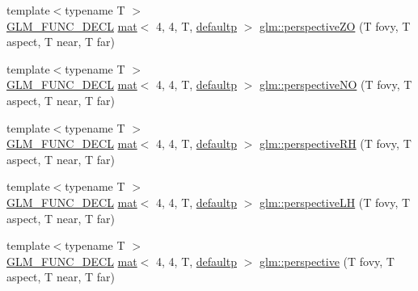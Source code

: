 \begin{DoxyCompactItemize}
\item 
{\footnotesize template$<$typename T $>$ }\\\mbox{\hyperlink{setup_8hpp_ab2d052de21a70539923e9bcbf6e83a51}{G\+L\+M\+\_\+\+F\+U\+N\+C\+\_\+\+D\+E\+CL}} \mbox{\hyperlink{structglm_1_1mat}{mat}}$<$ 4, 4, T, \mbox{\hyperlink{namespaceglm_a36ed105b07c7746804d7fdc7cc90ff25a9d21ccd8b5a009ec7eb7677befc3bf51}{defaultp}} $>$ \mbox{\hyperlink{group__gtc__matrix__transform_gaa9dfba5c2322da54f72b1eb7c7c11b47}{glm\+::perspective\+ZO}} (T fovy, T aspect, T near, T far)
\item 
{\footnotesize template$<$typename T $>$ }\\\mbox{\hyperlink{setup_8hpp_ab2d052de21a70539923e9bcbf6e83a51}{G\+L\+M\+\_\+\+F\+U\+N\+C\+\_\+\+D\+E\+CL}} \mbox{\hyperlink{structglm_1_1mat}{mat}}$<$ 4, 4, T, \mbox{\hyperlink{namespaceglm_a36ed105b07c7746804d7fdc7cc90ff25a9d21ccd8b5a009ec7eb7677befc3bf51}{defaultp}} $>$ \mbox{\hyperlink{group__gtc__matrix__transform_gaf497e6bca61e7c87088370b126a93758}{glm\+::perspective\+NO}} (T fovy, T aspect, T near, T far)
\item 
{\footnotesize template$<$typename T $>$ }\\\mbox{\hyperlink{setup_8hpp_ab2d052de21a70539923e9bcbf6e83a51}{G\+L\+M\+\_\+\+F\+U\+N\+C\+\_\+\+D\+E\+CL}} \mbox{\hyperlink{structglm_1_1mat}{mat}}$<$ 4, 4, T, \mbox{\hyperlink{namespaceglm_a36ed105b07c7746804d7fdc7cc90ff25a9d21ccd8b5a009ec7eb7677befc3bf51}{defaultp}} $>$ \mbox{\hyperlink{group__gtc__matrix__transform_ga26b88757fbd90601b80768a7e1ad3aa1}{glm\+::perspective\+RH}} (T fovy, T aspect, T near, T far)
\item 
{\footnotesize template$<$typename T $>$ }\\\mbox{\hyperlink{setup_8hpp_ab2d052de21a70539923e9bcbf6e83a51}{G\+L\+M\+\_\+\+F\+U\+N\+C\+\_\+\+D\+E\+CL}} \mbox{\hyperlink{structglm_1_1mat}{mat}}$<$ 4, 4, T, \mbox{\hyperlink{namespaceglm_a36ed105b07c7746804d7fdc7cc90ff25a9d21ccd8b5a009ec7eb7677befc3bf51}{defaultp}} $>$ \mbox{\hyperlink{group__gtc__matrix__transform_ga9bd34951dc7022ac256fcb51d7f6fc2f}{glm\+::perspective\+LH}} (T fovy, T aspect, T near, T far)
\item 
{\footnotesize template$<$typename T $>$ }\\\mbox{\hyperlink{setup_8hpp_ab2d052de21a70539923e9bcbf6e83a51}{G\+L\+M\+\_\+\+F\+U\+N\+C\+\_\+\+D\+E\+CL}} \mbox{\hyperlink{structglm_1_1mat}{mat}}$<$ 4, 4, T, \mbox{\hyperlink{namespaceglm_a36ed105b07c7746804d7fdc7cc90ff25a9d21ccd8b5a009ec7eb7677befc3bf51}{defaultp}} $>$ \mbox{\hyperlink{group__gtc__matrix__transform_ga747c8cf99458663dd7ad1bb3a2f07787}{glm\+::perspective}} (T fovy, T aspect, T near, T far)

\end{DoxyCompactItemize}
